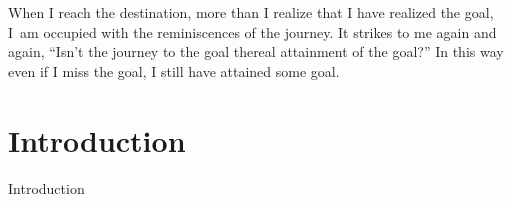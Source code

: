 {{{\raggedright
\ii When I reach the destination, more than I realize that I have realized the goal, I~am occupied with the reminiscences of the journey. It strikes to me again and again, ``Isn't the journey to the goal the\break real attainment of the goal?'' In this way even if I miss {\sixteencaps the} goal, I still have attained {\sixteencaps some} goal.


}
 







\newpage{}\footline{\centerline{\foliofont\folio}}
{}
\cl{\textcolor{sectioncolor}{\sectionfont Contents}}


{\parskip0pt\bs\bs
\readtocfile}



























\section{Introduction}{Introduction}


}}
